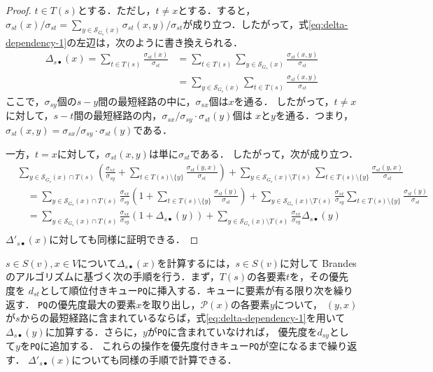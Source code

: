 \begin{proof}
  $t\in T(s)$とする．ただし，$t\neq x$とする．すると，$\sigma_{st}(x)/\sigma_{st}=\sum_{y\in\mathcal{S}_{G_s}(x)}\sigma_{st}(x,y)/\sigma_{st}$が成り立つ．したがって，式\ref{eq:delta-dependency-1}の左辺は，次のように書き換えられる．
  \begin{equation*}
    \begin{aligned}
      \Delta_{s\bullet}(x)=\sum_{t\in T(s)}\frac{\sigma_{st}(x)}{\sigma_{st}}
      &=\sum_{t\in T(s)}\sum_{y\in\mathcal{S}_{G_s}(x)}\frac{\sigma_{st}(x,y)}{\sigma_{st}}\\
      &=\sum_{y\in\mathcal{S}_{G_s}(x)}\sum_{t\in T(s)}\frac{\sigma_{st}(x,y)}{\sigma_{st}}
    \end{aligned}
  \end{equation*}
  ここで，$\sigma_{sy}$個の$s-y$間の最短経路の中に，$\sigma_{sx}$個は$x$を通る．
  したがって，$t\neq x$に対して，$s-t$間の最短経路の内，$\sigma_{sx}/\sigma_{sy}\cdot\sigma_{st}(y)$個は
  $x$と$y$を通る．つまり，$\sigma_{st}(x,y)=\sigma_{sx}/\sigma_{sy}\cdot\sigma_{st}(y)$である．

  一方，$t=x$に対して，$\sigma_{st}(x,y)$は単に$\sigma_{st}$である．
  したがって，次が成り立つ．
  \begin{equation*}
    \begin{aligned}
      &\sum_{y\in\mathcal{S}_{G_s}(x)\cap T(s)}\left(\frac{\sigma_{sx}}{\sigma_{sy}}+\sum_{t\in T(s)\setminus\{y\}}\frac{\sigma_{st}(y,x)}{\sigma_{st}}\right)
      +\sum_{y\in\mathcal{S}_{G_s}(x)\setminus T(s)}\sum_{t\in T(s)\setminus\{y\}}\frac{\sigma_{st}(y,x)}{\sigma_{st}} \\
      &\quad=\sum_{y\in\mathcal{S}_{G_s}(x)\cap T(s)}\frac{\sigma_{sx}}{\sigma_{sy}}\left(1+\sum_{t\in T(s)\setminus\{y\}}\frac{\sigma_{st}(y)}{\sigma_{st}}\right)
      +\sum_{y\in\mathcal{S}_{G_s}(x)\setminus T(s)}\frac{\sigma_{sx}}{\sigma_{sy}}\sum_{t\in T(s)\setminus\{y\}}\frac{\sigma_{st}(y)}{\sigma_{st}} \\
      &\quad=\sum_{y\in\mathcal{S}_{G_s}(x)\cap T(s)}\frac{\sigma_{sx}}{\sigma_{sy}}\left(1+\Delta_{s\bullet}(y)\right)
      +\sum_{y\in\mathcal{S}_{G_s}(x)\setminus T(s)}\frac{\sigma_{sx}}{\sigma_{sy}}\Delta_{s\bullet}(y) \\
    \end{aligned}
  \end{equation*}
  $\Delta'_{s\bullet}(x)$に対しても同様に証明できる．
\end{proof}

$s\in S(v),x\in V$について$\Delta_{s\bullet}(x)$を計算するには，$s\in S(v)$に対して
Brandesのアルゴリズムに基づく次の手順を行う．まず，$T(s)$の各要素$t$を，その優先度を
$d_{st}$として順位付きキュー\texttt{PQ}に挿入する．キューに要素が有る限り次を繰り返す．
\texttt{PQ}の優先度最大の要素$x$を取り出し，$\mathcal{P}(x)$の各要素$y$について，
$(y,x)$が$s$からの最短経路に含まれているならば，式\eqref{eq:delta-dependency-1}を用いて
$\Delta_{s\bullet}(y)$に加算する．さらに，$y$が\texttt{PQ}に含まれていなければ，
優先度を$d_{sy}$として$y$を\texttt{PQ}に追加する．
これらの操作を優先度付きキュー\texttt{PQ}が空になるまで繰り返す．
$\Delta'_{s\bullet}(x)$についても同様の手順で計算できる．

